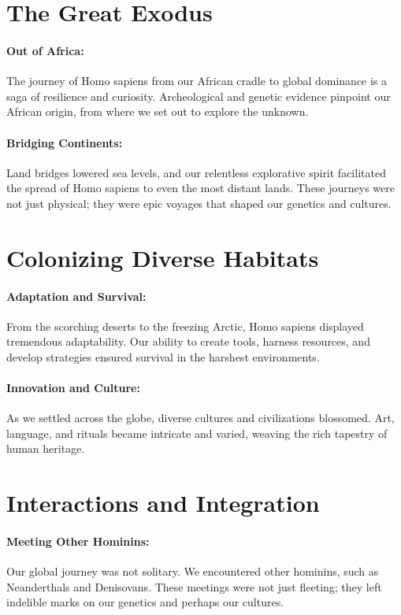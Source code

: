 \documentclass{book}
\begin{document}
\section*{The Great Exodus}

\paragraph{Out of Africa:}
The journey of Homo sapiens from our African cradle to global dominance is a saga of resilience and curiosity. Archeological and genetic evidence pinpoint our African origin, from where we set out to explore the unknown.

\paragraph{Bridging Continents:}
Land bridges lowered sea levels, and our relentless explorative spirit facilitated the spread of Homo sapiens to even the most distant lands. These journeys were not just physical; they were epic voyages that shaped our genetics and cultures.

\section*{Colonizing Diverse Habitats}

\paragraph{Adaptation and Survival:}
From the scorching deserts to the freezing Arctic, Homo sapiens displayed tremendous adaptability. Our ability to create tools, harness resources, and develop strategies ensured survival in the harshest environments.

\paragraph{Innovation and Culture:}
As we settled across the globe, diverse cultures and civilizations blossomed. Art, language, and rituals became intricate and varied, weaving the rich tapestry of human heritage.

\section*{Interactions and Integration}

\paragraph{Meeting Other Hominins:}
Our global journey was not solitary. We encountered other hominins, such as Neanderthals and Denisovans. These meetings were not just fleeting; they left indelible marks on our genetics and perhaps our cultures.
\end{document}
